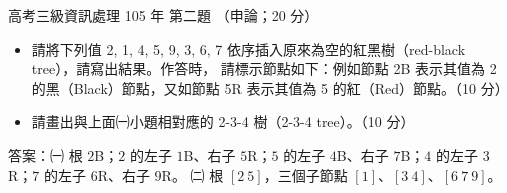 \begin{pastexam}[label={px:gk3-105-ds-02}]{高考三級資訊處理 105 年 第二題}
（申論；20 分）

\begin{itemize}[leftmargin=2.2em]
\item[㈠] 請將下列值 2, 1, 4, 5, 9, 3, 6, 7 依序插入原來為空的紅黑樹（red-black tree），請寫出結果。作答時，
請標示節點如下：例如節點 2B 表示其值為 2 的黑（Black）節點，又如節點 5R 表示其值為 5 的紅（Red）節點。（10 分）
\item[㈡] 請畫出與上面㈠小題相對應的 2-3-4 樹（2-3-4 tree）。（10 分）
\end{itemize}
\end{pastexam}

\begin{pastsoln}
答案：㈠ 根 $2$B；$2$ 的左子 $1$B、右子 $5$R；$5$ 的左子 $4$B、右子 $7$B；$4$ 的左子 $3$R；$7$ 的左子
$6$R、右子 $9$R。 ㈡ 根 $[2\ 5]$，三個子節點 $[1]$、$[3\ 4]$、$[6\ 7\ 9]$。


\end{pastsoln}
